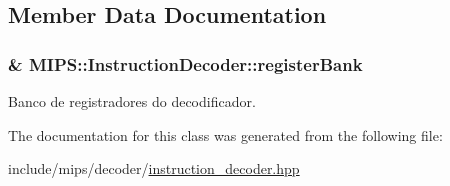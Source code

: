 \subsection{Member Data Documentation}
\subsubsection[{\texorpdfstring{register\+Bank}{registerBank}}]{\& M\+I\+P\+S\+::\+Instruction\+Decoder\+::register\+Bank\hspace{0.3cm}{\ttfamily [protected]}}\hypertarget{classMIPS_1_1InstructionDecoder_a6796453642fca3384868a9539656ab45}{}\label{classMIPS_1_1InstructionDecoder_a6796453642fca3384868a9539656ab45}
Banco de registradores do decodificador. 

The documentation for this class was generated from the following file\+:\begin{DoxyCompactItemize}
\item 
include/mips/decoder/\hyperlink{instruction__decoder_8hpp}{instruction\+\_\+decoder.\+hpp}\end{DoxyCompactItemize}
